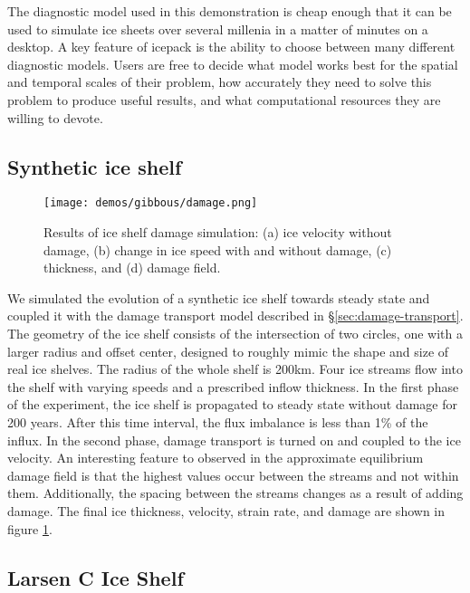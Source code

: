 \documentclass[journal abbreviation, manuscript]{copernicus}
\begin{document}
The diagnostic model used in this demonstration is cheap enough that it can be used to simulate ice sheets over several millenia in a matter of minutes on a desktop.
A key feature of icepack is the ability to choose between many different diagnostic models.
Users are free to decide what model works best for the spatial and temporal scales of their problem, how accurately they need to solve this problem to produce useful results, and what computational resources they are willing to devote.


\subsection{Synthetic ice shelf}

\begin{figure}[h]
    \texttt{[image: demos/gibbous/damage.png]}
    \caption{Results of ice shelf damage simulation: (a) ice velocity without damage, (b) change in ice speed with and without damage, (c) thickness, and (d) damage field.}
    \label{fig:damage}
\end{figure}

We simulated the evolution of a synthetic ice shelf towards steady state and coupled it with the damage transport model described in \S\ref{sec:damage-transport}.
The geometry of the ice shelf consists of the intersection of two circles, one with a larger radius and offset center, designed to roughly mimic the shape and size of real ice shelves.
The radius of the whole shelf is 200km.
Four ice streams flow into the shelf with varying speeds and a prescribed inflow thickness.
In the first phase of the experiment, the ice shelf is propagated to steady state without damage for 200 years.
After this time interval, the flux imbalance is less than 1\% of the influx.
In the second phase, damage transport is turned on and coupled to the ice velocity.
An interesting feature to observed in the approximate equilibrium damage field is that the highest values occur between the streams and not within them.
Additionally, the spacing between the streams changes as a result of adding damage.
The final ice thickness, velocity, strain rate, and damage are shown in figure \ref{fig:damage}.


\subsection{Larsen C Ice Shelf}
\end{document}
